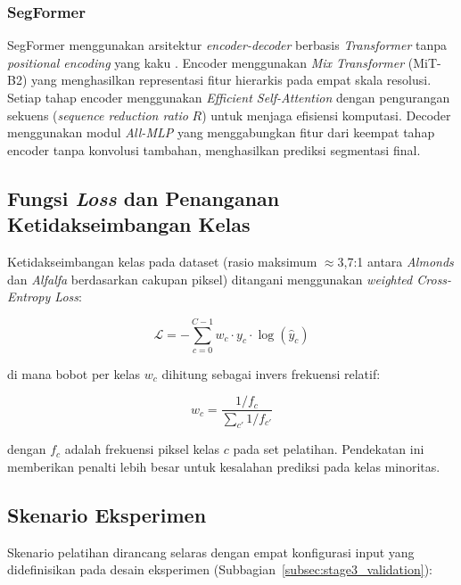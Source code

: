 \subsubsection{SegFormer}

SegFormer menggunakan arsitektur \textit{encoder-decoder} berbasis \textit{Transformer} tanpa \textit{positional encoding} yang kaku \citep{xie2021}. Encoder menggunakan \textit{Mix Transformer} (MiT-B2) yang menghasilkan representasi fitur hierarkis pada empat skala resolusi. Setiap tahap encoder menggunakan \textit{Efficient Self-Attention} dengan pengurangan sekuens (\textit{sequence reduction ratio} $R$) untuk menjaga efisiensi komputasi. Decoder menggunakan modul \textit{All-MLP} yang menggabungkan fitur dari keempat tahap encoder tanpa konvolusi tambahan, menghasilkan prediksi segmentasi final.

\subsection{Fungsi \textit{Loss} dan Penanganan Ketidakseimbangan Kelas}

Ketidakseimbangan kelas pada dataset (rasio maksimum $\approx$3,7:1 antara \textit{Almonds} dan \textit{Alfalfa} berdasarkan cakupan piksel) ditangani menggunakan \textit{weighted Cross-Entropy Loss}:

\begin{equation}
    \mathcal{L} = -\sum_{c=0}^{C-1} w_c \cdot y_c \cdot \log(\hat{y}_c)
\end{equation}

di mana bobot per kelas $w_c$ dihitung sebagai invers frekuensi relatif:

\begin{equation}
    w_c = \frac{1 / f_c}{\sum_{c'} 1 / f_{c'}}
\end{equation}

dengan $f_c$ adalah frekuensi piksel kelas $c$ pada set pelatihan. Pendekatan ini memberikan penalti lebih besar untuk kesalahan prediksi pada kelas minoritas.

\subsection{Skenario Eksperimen}

Skenario pelatihan dirancang selaras dengan empat konfigurasi input yang didefinisikan pada desain eksperimen (Subbagian~\ref{subsec:stage3_validation}):

